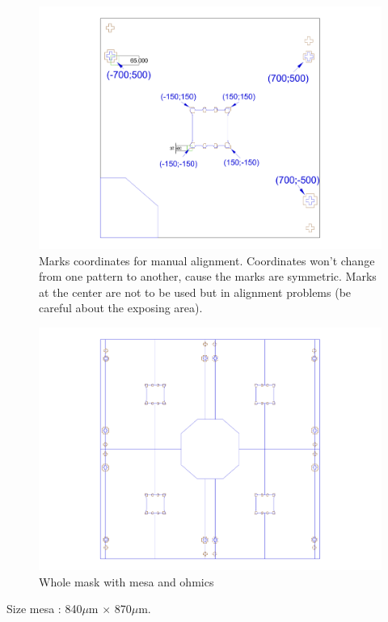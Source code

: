 \begin{figure} [h] \centering
\includegraphics[scale=0.6]{fig/DD_Dots_V6_with_coord.pdf}
\caption{Marks coordinates for manual alignment. Coordinates won't change from one pattern to another, cause 
the marks are symmetric. Marks at the center are not to be used but in alignment problems (be careful about the exposing area).} \label{align1}
\end{figure}

\newpage

\begin{figure} [ht] \centering
\includegraphics[scale=0.6]{fig/DD_Dots_V5_ebl_whole_mesa_ohmics.pdf}
\caption{Whole mask with mesa and ohmics} \label{align1}
\end{figure}

Size mesa : 840$\mu$m $\times$ 870$\mu$m. \\

